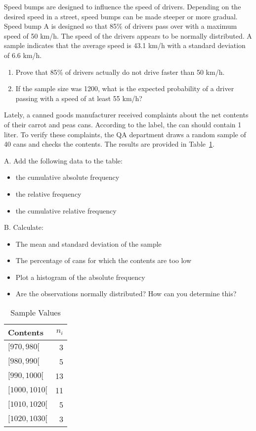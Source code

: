 \begin{exercise}
  Speed bumps are designed to influence the speed of drivers. 
  Depending on the desired speed in a street, speed bumps can be made steeper or more gradual.
  Speed bump A is designed so that 85\% of drivers pass over with a maximum speed of 50 km/h. 
  The speed of the drivers appears to be normally distributed. A sample indicates that the average speed is 43.1 km/h with a standard deviation of 6.6 km/h.

  \begin{enumerate}[label=\alph*.]
    \item Prove that 85\% of drivers actually do not drive faster than 50 km/h.
    \item If the sample size was 1200, what is the expected probability of a driver passing with a speed of at least 55 km/h?
  \end{enumerate}
\end{exercise}

\begin{exercise}
  Lately, a canned goods manufacturer received complaints about the net contents of their carrot and peas cans. 
  According to the label, the can should contain 1 liter. 
  To verify these complaints, the QA department draws a random sample of 40 cans and checks the contents. 
  The results are provided in Table~\ref{tab:canned-goods-sample-values}.

  A. Add the following data to the table:
  \begin{itemize}
    \item the cumulative absolute frequency
    \item the relative frequency
    \item the cumulative relative frequency
  \end{itemize}

  B. Calculate:
  \begin{itemize}
    \item The mean and standard deviation of the sample
    \item The percentage of cans for which the contents are too low
    \item Plot a histogram of the absolute frequency
    \item Are the observations normally distributed? How can you determine this?
  \end{itemize}
\end{exercise}

\begin{table}
  \centering
  \begin{tabular}{lr}
    \toprule
    Contents & $n_{i}$ \\
    \midrule
    $[970,980[$ & 3 \\
    $[980,990[$ & 5 \\
    $[990,1000[$ & 13 \\
    $[1000,1010[$ & 11 \\
    $[1010,1020[$ & 5 \\
    $[1020,1030[$ & 3 \\
    \bottomrule
  \end{tabular}
  \caption{Sample Values}
  \label{tab:canned-goods-sample-values}
\end{table}

